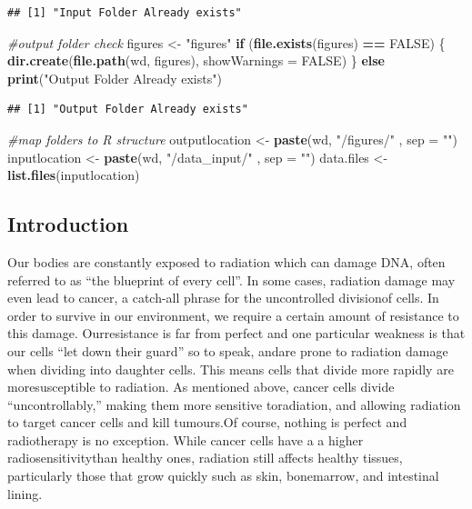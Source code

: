 \documentclass[]{article}
\newenvironment{Shaded}{\begin{snugshade}}{\end{snugshade}}
\newcommand{\KeywordTok}[1]{\textcolor[rgb]{0.13,0.29,0.53}{\textbf{#1}}}
\newcommand{\DataTypeTok}[1]{\textcolor[rgb]{0.13,0.29,0.53}{#1}}
\newcommand{\StringTok}[1]{\textcolor[rgb]{0.31,0.60,0.02}{#1}}
\newcommand{\CommentTok}[1]{\textcolor[rgb]{0.56,0.35,0.01}{\textit{#1}}}
\newcommand{\OtherTok}[1]{\textcolor[rgb]{0.56,0.35,0.01}{#1}}
\newcommand{\ControlFlowTok}[1]{\textcolor[rgb]{0.13,0.29,0.53}{\textbf{#1}}}
\newcommand{\OperatorTok}[1]{\textcolor[rgb]{0.81,0.36,0.00}{\textbf{#1}}}
\newcommand{\NormalTok}[1]{#1}
\begin{document}
\begin{verbatim}
## [1] "Input Folder Already exists"
\end{verbatim}

\begin{Shaded}
\begin{Highlighting}[]
\CommentTok{#output folder check }
\NormalTok{figures <-}\StringTok{ "figures"}
\ControlFlowTok{if}\NormalTok{ (}\KeywordTok{file.exists}\NormalTok{(figures) }\OperatorTok{==}\StringTok{ }\OtherTok{FALSE}\NormalTok{) \{}
  \KeywordTok{dir.create}\NormalTok{(}\KeywordTok{file.path}\NormalTok{(wd, figures), }\DataTypeTok{showWarnings =} \OtherTok{FALSE}\NormalTok{) }
\NormalTok{\} }\ControlFlowTok{else} \KeywordTok{print}\NormalTok{(}\StringTok{"Output Folder Already exists"}\NormalTok{)}
\end{Highlighting}
\end{Shaded}

\begin{verbatim}
## [1] "Output Folder Already exists"
\end{verbatim}

\begin{Shaded}
\begin{Highlighting}[]
\CommentTok{#map folders to R structure}
\NormalTok{outputlocation <-}\StringTok{ }\KeywordTok{paste}\NormalTok{(wd, }\StringTok{"/figures/"}\NormalTok{ , }\DataTypeTok{sep =} \StringTok{""}\NormalTok{)}
\NormalTok{inputlocation <-}\StringTok{ }\KeywordTok{paste}\NormalTok{(wd, }\StringTok{"/data_input/"}\NormalTok{ , }\DataTypeTok{sep =} \StringTok{""}\NormalTok{)}
\NormalTok{data.files <-}\StringTok{ }\KeywordTok{list.files}\NormalTok{(inputlocation)}
\end{Highlighting}
\end{Shaded}

\subsection{Introduction}\label{introduction}

Our bodies are constantly exposed to radiation which can damage DNA,
often referred to as ``the blueprint of every cell''. In some cases,
radiation damage may even lead to cancer, a catch-all phrase for the
uncontrolled divisionof cells. In order to survive in our environment,
we require a certain amount of resistance to this damage. Ourresistance
is far from perfect and one particular weakness is that our cells ``let
down their guard'' so to speak, andare prone to radiation damage when
dividing into daughter cells. This means cells that divide more rapidly
are moresusceptible to radiation. As mentioned above, cancer cells
divide ``uncontrollably,'' making them more sensitive toradiation, and
allowing radiation to target cancer cells and kill tumours.Of course,
nothing is perfect and radiotherapy is no exception. While cancer cells
have a a higher radiosensitivitythan healthy ones, radiation still
affects healthy tissues, particularly those that grow quickly such as
skin, bonemarrow, and intestinal lining.
\end{document}
